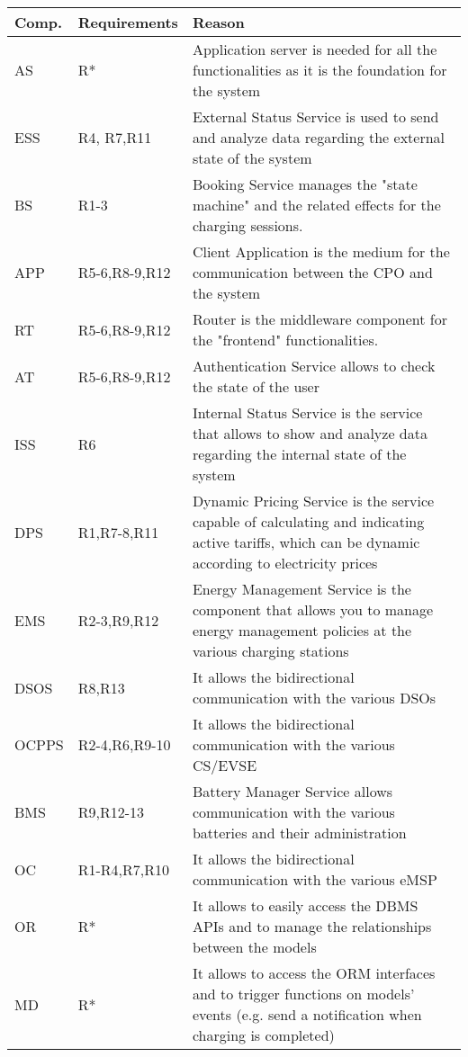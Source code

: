 \begin{tabular}{|p{1.5cm}|p{3cm}|p{10cm}|}
	\hline
	\bf{Comp.} & \bf{Requirements} & \bf{Reason} \\
	\hline
	\hline
	AS & R* & Application server is needed for all the functionalities as it is the foundation for the system\\
	\hline
	ESS & R4, R7,R11 &  External Status Service is used to send and analyze data regarding the external state of the system\\
	\hline
	BS & R1-3 & Booking Service manages the "state machine" and the related effects for the charging sessions.\\
	\hline
	APP & R5-6,R8-9,R12 & Client Application is the medium for the communication between the CPO and the system \\
	\hline
	RT & R5-6,R8-9,R12 & Router is the middleware component for the "frontend" functionalities.\\
	\hline
	AT & R5-6,R8-9,R12 & Authentication Service allows to check the state of the user\\
	\hline
	ISS & R6 & Internal Status Service is the service that allows to show and analyze data regarding the internal state of the system\\
	\hline
	DPS & R1,R7-8,R11 &Dynamic Pricing Service is the service capable of calculating and indicating active tariffs, which can be dynamic according to electricity prices\\
	\hline
	EMS & R2-3,R9,R12 & Energy Management Service is the component that allows you to manage energy management policies at the various charging stations\\
	\hline
	DSOS & R8,R13 & It allows the bidirectional communication with the various DSOs\\
	\hline
	OCPPS & R2-4,R6,R9-10  & It allows the bidirectional communication with the various CS/EVSE\\
	\hline
	BMS &  R9,R12-13 & Battery Manager Service allows communication with the various batteries and their administration\\
	\hline
	OC & R1-R4,R7,R10 & It allows the bidirectional communication with the various eMSP\\
	\hline
	OR &  R*& It allows to easily access the DBMS APIs and to manage the relationships between the models\\
	\hline
	MD & R* & It allows to access the ORM interfaces and to trigger functions on models’ events (e.g. send a notification when charging is completed)\\
	\hline
\end{tabular}





















